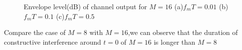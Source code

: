 \documentclass{article}
\begin{document}
\begin{flushleft}
\begin{enumerate}
\newpage
\begin{figure}[H]
\centering
{}
\caption{Envelope level(dB) of channel output for $M=16$ (a)$f_mT=0.01$ (b)$f_mT=0.1$ (c)$f_mT=0.5$}
\end{figure}
Compare the case of $M=8$ with $M=16$,we can observe that the duration of constructive interference around $t=0$ of $M=16$ is longer than $M=8$


\end{enumerate}
\end{flushleft}
\end{document}
